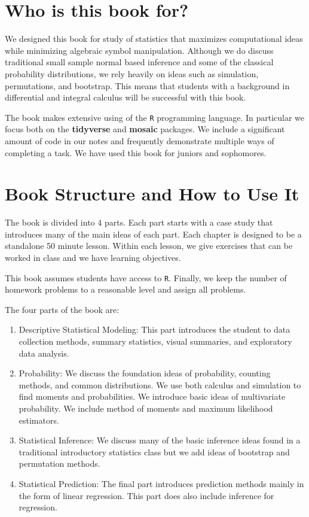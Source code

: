 \documentclass[
]{book}
\begin{document}
\hypertarget{who-is-this-book-for}{%
\section{Who is this book for?}\label{who-is-this-book-for}}

We designed this book for study of statistics that maximizes computational ideas while minimizing algebraic symbol manipulation. Although we do discuss traditional small sample normal based inference and some of the classical probability distributions, we rely heavily on ideas such as simulation, permutations, and bootstrap. This means that students with a background in differential and integral calculus will be successful with this book.

The book makes extensive using of the \texttt{R} programming language. In particular we focus both on the \textbf{tidyverse} and \textbf{mosaic} packages. We include a significant amount of code in our notes and frequently demonstrate multiple ways of completing a task. We have used this book for juniors and sophomores.

\hypertarget{book-structure-and-how-to-use-it}{%
\section{Book Structure and How to Use It}\label{book-structure-and-how-to-use-it}}

The book is divided into 4 parts. Each part starts with a case study that introduces many of the main ideas of each part. Each chapter is designed to be a standalone 50 minute lesson. Within each lesson, we give exercises that can be worked in class and we have learning objectives.

This book assumes students have access to \texttt{R}. Finally, we keep the number of homework problems to a reasonable level and assign all problems.

The four parts of the book are:

\begin{enumerate}
\def\labelenumi{\arabic{enumi}.}
\item
  Descriptive Statistical Modeling: This part introduces the student to data collection methods, summary statistics, visual summaries, and exploratory data analysis.
\item
  Probability: We discuss the foundation ideas of probability, counting methods, and common distributions. We use both calculus and simulation to find moments and probabilities. We introduce basic ideas of multivariate probability. We include method of moments and maximum likelihood estimators.
\item
  Statistical Inference: We discuss many of the basic inference ideas found in a traditional introductory statistics class but we add ideas of bootstrap and permutation methods.
\item
  Statistical Prediction: The final part introduces prediction methods mainly in the form of linear regression. This part does also include inference for regression.
\end{enumerate}
\end{document}
